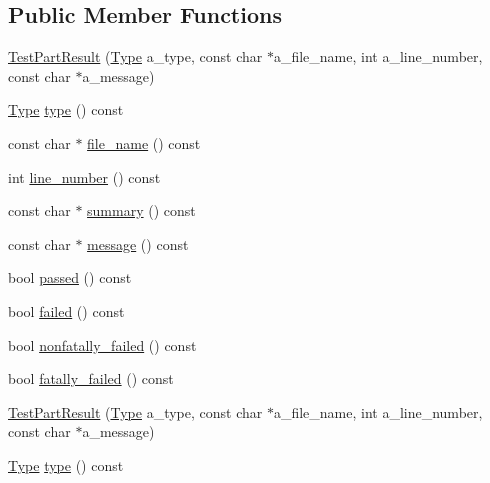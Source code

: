 \subsection*{Public Member Functions}
\begin{DoxyCompactItemize}
\item 
\hyperlink{classtesting_1_1_test_part_result_a6409eb519c1cd514aab2426c8f40737f}{Test\-Part\-Result} (\hyperlink{classtesting_1_1_test_part_result_a65ae656b33fdfdfffaf34858778a52d5}{Type} a\-\_\-type, const char $\ast$a\-\_\-file\-\_\-name, int a\-\_\-line\-\_\-number, const char $\ast$a\-\_\-message)
\item 
\hyperlink{classtesting_1_1_test_part_result_a65ae656b33fdfdfffaf34858778a52d5}{Type} \hyperlink{classtesting_1_1_test_part_result_ae852bf8693f066078c74c34345531940}{type} () const 
\item 
const char $\ast$ \hyperlink{classtesting_1_1_test_part_result_a5d8742dc28ddb880cd2391edb9fc2c9b}{file\-\_\-name} () const 
\item 
int \hyperlink{classtesting_1_1_test_part_result_a174900cf4403d23784af34f50e7b0a46}{line\-\_\-number} () const 
\item 
const char $\ast$ \hyperlink{classtesting_1_1_test_part_result_af0d4f960b453ce087c581fe13817b2a3}{summary} () const 
\item 
const char $\ast$ \hyperlink{classtesting_1_1_test_part_result_aae73962246be4d200e2c1d04246a708a}{message} () const 
\item 
bool \hyperlink{classtesting_1_1_test_part_result_a901bd62d9fbe7f39826a9d02ab2bdaec}{passed} () const 
\item 
bool \hyperlink{classtesting_1_1_test_part_result_aaf835515fb53eb1aa01c1798b05e61f6}{failed} () const 
\item 
bool \hyperlink{classtesting_1_1_test_part_result_a7bb08c87fbc1664f9fcca1504339ed29}{nonfatally\-\_\-failed} () const 
\item 
bool \hyperlink{classtesting_1_1_test_part_result_a34d31718b5fc6c06f73d03e8dbb1aa9e}{fatally\-\_\-failed} () const 
\item 
\hyperlink{classtesting_1_1_test_part_result_a6409eb519c1cd514aab2426c8f40737f}{Test\-Part\-Result} (\hyperlink{classtesting_1_1_test_part_result_a65ae656b33fdfdfffaf34858778a52d5}{Type} a\-\_\-type, const char $\ast$a\-\_\-file\-\_\-name, int a\-\_\-line\-\_\-number, const char $\ast$a\-\_\-message)
\item 
\hyperlink{classtesting_1_1_test_part_result_a65ae656b33fdfdfffaf34858778a52d5}{Type} \hyperlink{classtesting_1_1_test_part_result_ae852bf8693f066078c74c34345531940}{type} () const 

\end{DoxyCompactItemize}
